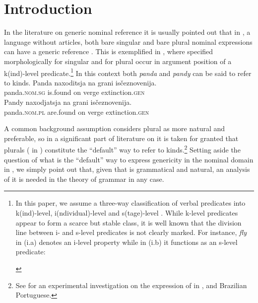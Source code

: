 \documentclass[output=paper
,modfonts
,nonflat]{langsci/langscibook}
\begin{document}
	\section{Introduction} \label{sec:borik:1}
	In the literature on generic nominal reference it is usually pointed out that in , a language without articles, both bare singular and bare plural nominal expressions can have a generic reference \citep{Chierchia1998,Doron2003,Dayal2004}. This is exemplified in , where  specified morphologically for singular  and for plural  occur in argument position of a k(ind)-level predicate.\footnote{In this paper, we assume a three-way classification of verbal predicates into k(ind)-level, i(ndividual)-level and s(tage)-level \citep{Carlson1977}. While k-level predicates appear to form a scarce but stable class, it is well known that the division line between i- and s-level predicates is not clearly marked. For instance, \textit{fly} in (i.a) denotes an i-level property while in (i.b) it functions as an s-level predicate: 
		
	\begin{exe}\label{ex:borik:i}
		\begin{xlist}
			\label{ex:borik:ia} 
			\label{ex:borik:ib} 
		\end{xlist}
	\end{exe}\vspace*{-\baselineskip}}
	\newpage
	In this context both \textit{panda} and \textit{pandy} can be said to refer to kinds. 
	\ea\label{ex:borik:1}
	\ea\label{ex:borik:1a}{
		\gll Panda naxoditsja		na		grani			is\v{c}eznovenija.\\ 
		panda.\textsc{nom.sg} is.found on verge extinction.\textsc{gen}\\
	}
	\ex\label{ex:borik:1b}{
		\gll Pandy		naxodjatsja	na	grani	is\v{c}eznovenija. \\
		panda.\textsc{nom.pl} 	are.found 	on	verge	extinction.\textsc{gen}\\
	}
	\z
	\z
	
	A common background assumption considers plural  as more natural and preferable, so in a significant part of literature on  it is taken for granted that plurals ( in ) constitute the ``default'' way to refer to kinds.\footnote{See \citet{Ionin2011} for an experimental investigation on the expression of  in ,  and Brazilian Portuguese.} Setting aside the question of what is the ``default'' way to express genericity in the nominal domain in , we simply point out that, given that  is grammatical and natural, an analysis of it is needed in the theory of grammar in any case.
	
\end{document}
